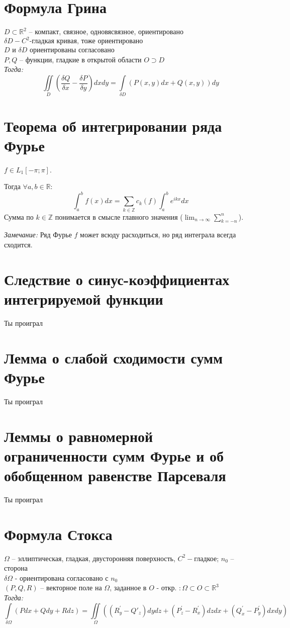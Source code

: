         \section{Формула Грина}
        $D \subset \mathds{R}^2$ -- компакт, связное, одновясвязное, ориентировано\\$\delta D-C^2\text{-гладкая кривая, тоже ориентировано}$\\
        $D$ и $\delta D$ ориентированы согласовано \\
        $P, Q$ -- функции, гладкие в открытой области $O \supset D$ \\
        \emph{Тогда:} $$\iint\limits_{D}(\frac{\delta Q}{\delta x} - \frac{\delta P}{\delta y})dxdy = \int\limits_{\delta D}(P(x,y)dx + Q(x,y))dy$$

    \section{Теорема об интегрировании ряда Фурье}
    $f \in L_1[-\pi;\pi]$.

    Тогда $\forall a, b \in \mathbb{R}$:
    $$\int_a^b f(x)dx = \sum_{k\in\mathbb{Z}} c_k(f) \int_a^b e^{ikx} dx$$
    Сумма по $k \in \mathbb{Z}$ понимается в смысле главного значения ($\lim_{n \to \infty} \sum_{k=-n}^n$).

    \emph{Замечание:} Ряд Фурье $f$ может всюду расходиться, но ряд интеграла всегда сходится.
    \section{Следствие о синус-коэффициентах интегрируемой функции}
    Ты проиграл
    
    \section{Лемма о слабой сходимости сумм Фурье}
    Ты проиграл
    
    \section{Леммы о равномерной ограниченности сумм Фурье и об обобщенном равенстве Парсеваля}
    Ты проиграл
    
    \section{Формула Стокса}
    $\Omega$ -- эллиптическая, гладкая, двусторонняя поверхность, $C^2-$гладкое; $n_0$ -- сторона\\
    $\delta \Omega$ - ориентирована согласовано с $n_0$\\
    $(P,Q,R)$ -- векторное поле на $\Omega$, заданное в $O$ - откр. $: \Omega \subset O\subset \mathds{R}^3$ \\
    \emph{Тогда:} $$\int\limits_{\delta \Omega}(Pdx + Qdy+Rdz) =
    \iint\limits_{\Omega}((R^{'}_y- Q{'}_z)dydz
    +(P^{'}_z-R^{'}_x)dzdx + (Q^{'}_x-P^{'}_y)dxdy)$$

